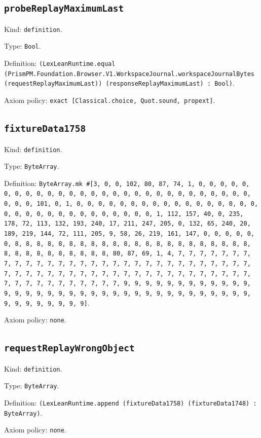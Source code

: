 \documentclass[11pt]{article}
\begin{document}
\subsection*{\texttt{probeReplayMaximumLast}}
\noindent Kind: \texttt{definition}.\par
\noindent Type: \texttt{Bool}.\par
\noindent Definition: \texttt{(LexLeanRuntime.equal (PrismPM.Foundation.Browser.V1.WorkspaceJournal.workspaceJournalBytes (requestReplayMaximumLast)) (responseReplayMaximumLast) : Bool)}.\par
\noindent Axiom policy: \texttt{exact [Classical.choice, Quot.sound, propext]}.\par
\subsection*{\texttt{fixtureData1758}}
\noindent Kind: \texttt{definition}.\par
\noindent Type: \texttt{ByteArray}.\par
\noindent Definition: \texttt{ByteArray.mk \#[3, 0, 0, 102, 80, 87, 74, 1, 0, 0, 0, 0, 0, 0, 0, 0, 0, 0, 0, 0, 0, 0, 0, 0, 0, 0, 0, 0, 0, 0, 0, 0, 0, 0, 0, 0, 0, 0, 0, 101, 0, 1, 0, 0, 0, 0, 0, 0, 0, 0, 0, 0, 0, 0, 0, 0, 0, 0, 0, 0, 0, 0, 0, 0, 0, 0, 0, 0, 0, 0, 0, 0, 0, 1, 112, 157, 40, 0, 235, 178, 72, 113, 132, 193, 240, 17, 211, 247, 205, 0, 132, 65, 240, 20, 189, 219, 144, 72, 111, 205, 9, 58, 26, 219, 161, 147, 0, 0, 0, 0, 0, 0, 8, 8, 8, 8, 8, 8, 8, 8, 8, 8, 8, 8, 8, 8, 8, 8, 8, 8, 8, 8, 8, 8, 8, 8, 8, 8, 8, 8, 8, 8, 8, 8, 80, 87, 69, 1, 4, 7, 7, 7, 7, 7, 7, 7, 7, 7, 7, 7, 7, 7, 7, 7, 7, 7, 7, 7, 7, 7, 7, 7, 7, 7, 7, 7, 7, 7, 7, 7, 7, 7, 7, 7, 7, 7, 7, 7, 7, 7, 7, 7, 7, 7, 7, 7, 7, 7, 7, 7, 7, 7, 7, 7, 7, 7, 7, 7, 7, 7, 7, 7, 7, 9, 9, 9, 9, 9, 9, 9, 9, 9, 9, 9, 9, 9, 9, 9, 9, 9, 9, 9, 9, 9, 9, 9, 9, 9, 9, 9, 9, 9, 9, 9, 9, 9, 9, 9, 9, 9, 9, 9, 9, 9, 9, 9]}.\par
\noindent Axiom policy: \texttt{none}.\par
\subsection*{\texttt{requestReplayWrongObject}}
\noindent Kind: \texttt{definition}.\par
\noindent Type: \texttt{ByteArray}.\par
\noindent Definition: \texttt{(LexLeanRuntime.append (fixtureData1758) (fixtureData1748) : ByteArray)}.\par
\noindent Axiom policy: \texttt{none}.\par
\end{document}
